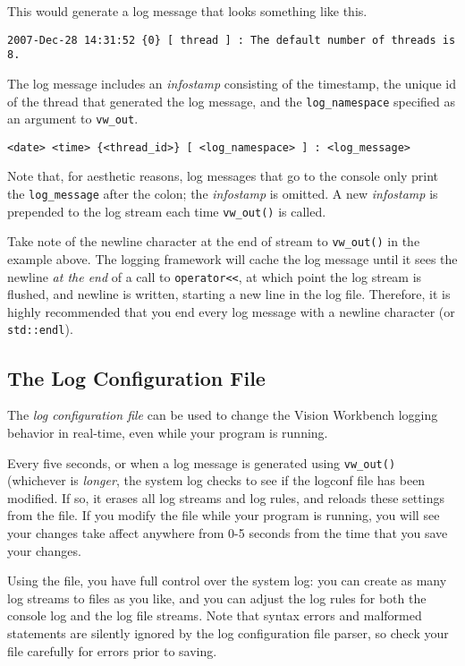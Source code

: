 This would generate a log message that looks something like this.

\begin{verbatim}
2007-Dec-28 14:31:52 {0} [ thread ] : The default number of threads is 8.
\end{verbatim}

The log message includes an {\em infostamp} consisting of the timestamp,
the unique id of the thread that generated the log message, and the
\verb#log_namespace# specified as an argument to \verb#vw_out#.  

\begin{verbatim}
<date> <time> {<thread_id>} [ <log_namespace> ] : <log_message>
\end{verbatim}

Note that, for aesthetic reasons, log messages that go to the console
only print the \verb#log_message# after the colon; the {\em infostamp} is
omitted. A new {\em infostamp} is prepended to the log stream each
time \verb#vw_out()# is called.

Take note of the newline character at the end of stream to
\verb#vw_out()# in the example above.  The logging framework will
cache the log message until it sees the newline {\em at the end} of a
call to \verb#operator<<#, at which point the log stream is flushed,
and newline is written, starting a new line in the log file.
Therefore, it is highly recommended that you end every log message
with a newline character (or \verb#std::endl#).

\subsection{The Log Configuration File}
\label{sec:logconf-file}

The {\em log configuration file} can be used to change the Vision
Workbench logging behavior in real-time, even while your program is
running.  

Every five seconds, or when a log message is generated using
\verb#vw_out()# (whichever is {\em longer}, the system log checks to
see if the logconf file has been modified.  If so, it erases all log
streams and log rules, and reloads these settings from the file.  If
you modify the file while your program is running, you will see your
changes take affect anywhere from 0-5 seconds from the time that you
save your changes.

Using the file, you have full control over the system log: you can
create as many log streams to files as you like, and you can adjust
the log rules for both the console log and the log file streams.  Note
that syntax errors and malformed statements are silently ignored by
the log configuration file parser, so check your file carefully for
errors prior to saving.

